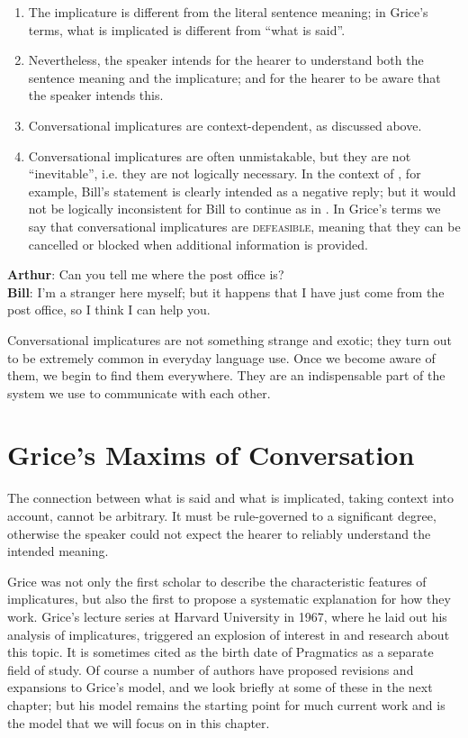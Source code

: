 \begin{enumerate}
\item The implicature is different from the literal sentence meaning; in Grice’s terms, what is implicated is different from “what is said”.
\item Nevertheless, the speaker intends for the hearer to understand both the sentence meaning and the implicature; and for the hearer to be aware that the speaker intends this.
\item Conversational implicatures are context-dependent, as discussed above.
\item Conversational implicatures are often unmistakable, but they are not “inevitable”, i.e. they are not logically necessary. In the context of , for example, Bill’s statement is clearly intended as a negative reply; but it would not be logically inconsistent for Bill to continue as in . In Grice’s terms we say that conversational implicatures are \textsc{defeasible}, meaning that they can be cancelled or blocked when additional information is provided.
\end{enumerate}

\ea \label{ex:8.4}
\textbf{Arthur}: Can you tell me where the post office is?\\
\textbf{Bill}: I’m a stranger here myself; but it happens that I have just come from the post office, so I think I can help you.
\z


Conversational implicatures are not something strange and exotic; they turn out to be extremely common in everyday language use. Once we become aware of them, we begin to find them everywhere. They are an indispensable part of the system we use to communicate with each other.


\section{Grice’s Maxims of Conversation}\label{sec:8.3}

The connection between what is said and what is implicated, taking context into account, cannot be arbitrary. It must be rule-governed to a significant degree, otherwise the speaker could not expect the hearer to reliably understand the intended meaning.



Grice was not only the first scholar to describe the characteristic features of implicatures, but also the first to propose a systematic explanation for how they work. Grice’s lecture series at Harvard University in 1967, where he laid out his analysis of implicatures, triggered an explosion of interest in and research about this topic. It is sometimes cited as the birth date of Pragmatics as a separate field of study. Of course a number of authors have proposed revisions and expansions to Grice’s model, and we look briefly at some of these in the next chapter; but his model remains the starting point for much current work and is the model that we will focus on in this chapter.



